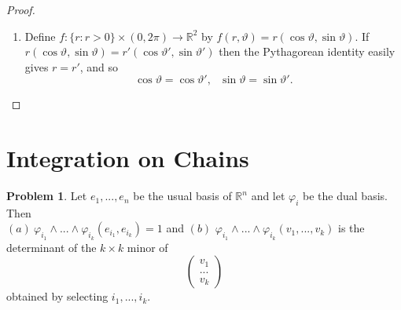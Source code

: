 \documentclass[20pt]{article}
\theoremstyle{plain}
\theoremstyle{definition}
\newtheorem*{problem}{Problem}
\newcommand{\reals}{\mathbb{R}}
\begin{document}
\begin{proof}
  \begin{enumerate}
    \item Define $f: \{r: r > 0 \} \times (0, 2\pi) \to \reals^2$ by
    $f(r, \vartheta) = r(\cos \vartheta, \sin \vartheta).$
    If $r(\cos \vartheta, \sin \vartheta) = r'(\cos \vartheta', \sin \vartheta')$
    then the Pythagorean identity easily gives $r = r'$, and so 
    $$\cos \vartheta = \cos \vartheta',\ \ \  \sin \vartheta = \sin \vartheta'.$$




  \end{enumerate}
\end{proof}


































































\break
\section{Integration on Chains}



\begin{problem}{4.1}
  Let $e_1, ..., e_n$ be the usual basis of $\mathbb{R}^n$ and let $\varphi_i$ be the dual basis.
  Then \\
  $(a) \ \varphi_{i_1} \wedge ... \wedge \varphi_{i_k} (e_{i_1}, e_{i_k}) = 1$ and
  $(b)$ $\varphi_{i_1} \wedge ... \wedge \varphi_{i_k}(v_1, ..., v_k)$ is the determinant of 
  the $k \times k$ minor of 
  $$\begin{pmatrix}v_1 \\ ...\\ v_k\end{pmatrix}$$
  obtained by selecting $i_1, ..., i_k$.
\end{problem}
\end{document}
